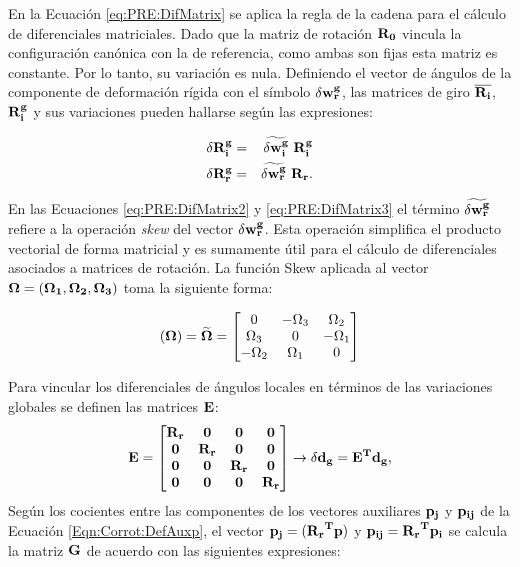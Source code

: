 En la Ecuación \eqref{eq:PRE:DifMatrix} se aplica la regla de la cadena para el cálculo de diferenciales matriciales. Dado que la matriz de rotación $\bf{R_0}$ vincula la configuración canónica con la de referencia, como ambas son fijas esta matriz es constante. Por lo tanto, su variación es nula. Definiendo el vector de ángulos de la componente de deformación rígida con el símbolo $\delta\bf{w}_r^g$, las matrices de giro $\overline{\bf{R_i}}$, $ \bf{R_i^g}$ y sus variaciones pueden hallarse según las expresiones:

\begin{eqnarray}
	\label{eq:PRE:DifMatrix2}
	\delta \bf{R_i^g} &=& \widetilde{\delta\bf{w}_i^g}~\bf{R}_i^g\\
	\label{eq:PRE:DifMatrix3}
	\delta \bf{R_r^g} &=& \widetilde{\delta\bf{w}_r^g}~\bf{R}_r.
\end{eqnarray}

En las Ecuaciones \eqref{eq:PRE:DifMatrix2} y \eqref{eq:PRE:DifMatrix3} el término $\widetilde{\delta\bf{w}_r^g}$ refiere a la operación \textit{skew} del vector $\delta\bf{w}_r^g$. Esta operación simplifica el producto vectorial de forma matricial y es sumamente útil para el cálculo de diferenciales asociados a matrices de rotación. La función \gls{Skew} aplicada al vector $\bf{\Omega}=(\Omega_1,\Omega_2,\Omega_3)$ toma la siguiente forma:

\begin{equation}\label{eq:PRE:Skew}
	(\bf{\Omega})=\widetilde{\bf{\Omega}}
	=
	\begin{bmatrix}
		0 &-\Omega_3  &\Omega_2   \\
		\Omega_3&0  & -\Omega_1  \\
		-\Omega_2  & \Omega_1 & 0
	\end{bmatrix}
\end{equation}

Para vincular los diferenciales de ángulos locales en términos de las variaciones globales se definen las matrices $\bf{E}$: 
\begin{equation}\label{Eqn:PRE:Corrot:DefE}
	\bf{E}=\begin{bmatrix}
		\bf{R_r}& \bf{0}   & \bf{0}   & \bf{0} \\
		\bf{0}  & \bf{R_r} & \bf{0}   & \bf{0}\\
		\bf{0}  & \bf{0}   & \bf{R_r} & \bf{0} \\
		\bf{0}  & \bf{0}   & \bf{0}   & \bf{R_r}
	\end{bmatrix}\rightarrow \delta \bf{d_g}=E^T \bf{d_g},
\end{equation}
 Según los cocientes entre las componentes de los vectores auxiliares $\bf{p}_j$ y $\bf{p_{ij}}$ de la Ecuación \eqref{Eqn:Corrot:DefAuxp}, el vector  $\bf{p_{j}}=(\bf{R_r}^T\bf{p})$ y  $\bf{p_{ij}}=\bf{R_r}^T\bf{p}_i$ se calcula la matriz $\bf{G}$ de acuerdo con las siguientes expresiones:

